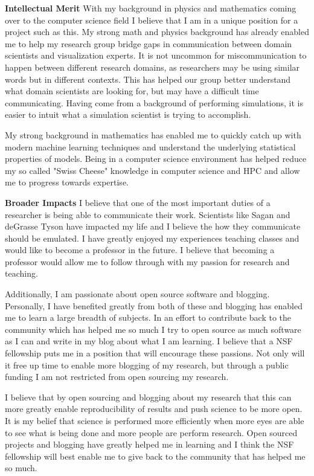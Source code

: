 \documentclass[12pt]{article}
\begin{document}
\textbf{Intellectual Merit}
%
With my background in physics and mathematics coming over to the computer
science field I believe that I am in a unique position for a project such as
this. My strong math and physics background has already enabled me to help my
research group bridge gaps in communication between domain scientists and
visualization experts. It is not uncommon for miscommunication to happen between
different research domains, as researchers may be using similar words but in
different contexts. This has helped our group better understand what domain
scientists are looking for, but may have a difficult time communicating. Having
come from a background of performing simulations, it is easier to intuit what a
simulation scientist is trying to accomplish.

My strong background in mathematics has enabled me to quickly catch up with
modern machine learning techniques and understand the underlying statistical
properties of models. Being in a computer science environment has helped reduce
my so called "Swiss Cheese" knowledge in computer science and HPC and allow me 
to progress towards expertise. 

\textbf{Broader Impacts}
%
I believe that one of the most important duties of a researcher is being able to
communicate their work. Scientists like Sagan and deGrasse Tyson have impacted
my life and I believe the how they communicate should be emulated. I have
greatly enjoyed my experiences teaching classes and would like to become a
professor in the future. I believe that becoming a professor would allow me to
follow through with my passion for research and teaching. 

Additionally, I am passionate about open source software and blogging.
Personally, I have benefited greatly from both of these and blogging has enabled
me to learn a large breadth of subjects. In an effort to contribute back to the
community which has helped me so much I try to open source as much software as I
can and write in my blog about what I am learning. I believe that a NSF
fellowship puts me in a position that will encourage these passions. Not only
will it free up time to enable more blogging of my research, but through a
public funding I am not restricted from open sourcing my research. 

I believe that by open sourcing and blogging about my research that this can
more greatly enable reproducibility of results and push science to be more open.
It is my belief that science is performed more efficiently when more eyes are
able to see what is being done and more people are perform research. Open
sourced projects and blogging have greatly helped me in learning and I think the
NSF fellowship will best enable me to give back to the community that has helped
me so much.
\end{document}
